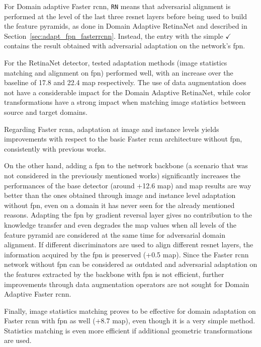 \documentclass[%
    corpo=12pt,
    twoside,
    stile=classica,   
    tipotesi=magistrale,
    evenboxes,
    english,
	numerazioneromana,
]{toptesi}
\begin{document}
For Domain adaptive Faster \gls{rcnn}, \texttt{RN} means that adversarial alignment is performed at the level of the last three \gls{resnet} layers before being used to build the feature pyramids, as done in Domain Adaptive RetinaNet\cite{pasqualino2020unsupervised} and described in Section~\ref{sec:adapt_fpn_fasterrcnn}. Instead, the entry with the simple $\checkmark$ contains the result obtained with adversarial adaptation on the network's \gls{fpn}.

\bigskip
For the RetinaNet detector, tested adaptation methods (image statistics matching and alignment on \gls{fpn}) performed well, with an increase over the baseline of 17.8 and 22.4 \gls{map} respectively. The use of data augmentation does not have a considerable impact for the Domain Adaptive RetinaNet, while color transformations have a strong impact when matching image statistics between source and target domains.

\bigskip
Regarding Faster \gls{rcnn}, adaptation at image and instance levels yields improvements with respect to the basic Faster \gls{rcnn} architecture without \gls{fpn}, consistently with previous works\cite{abramov2020simple}\cite{chen2018domain}\cite{saito2019strongweak}.

\medskip
On the other hand, adding a \gls{fpn} to the network backbone (a scenario that was not considered in the previously mentioned works) significantly increases the performances of the base detector (around +12.6 \acrshort{map}) and \gls{map} results are way better than the ones obtained through image and instance level adaptation without \gls{fpn}, even on a domain it has never seen for the already mentioned reasons. Adapting the \gls{fpn} by gradient reversal layer gives no contribution to the knowledge transfer and even degrades the \gls{map} values when all levels of the feature pyramid are considered at the same time for adversarial domain alignment. If different discriminators are used to align different \gls{resnet} layers, the information acquired by the \gls{fpn} is preserved (+0.5 \gls{map}). Since the Faster \gls{rcnn} network without \gls{fpn} can be considered as outdated and adversarial adaptation on the features extracted by the backbone with \gls{fpn} is not efficient, further improvements through data augmentation operators are not sought for Domain Adaptive Faster \gls{rcnn}.

\medskip
Finally, image statistics matching proves to be effective for domain adaptation on Faster \gls{rcnn} with \gls{fpn} as well (+8.7 \gls{map}), even though it is a very simple method. Statistics matching is even more efficient if additional geometric transformations are used.
\end{document}
